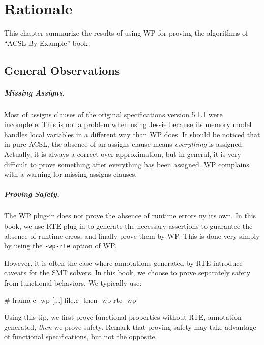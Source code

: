 \chapter{Rationale}

This chapter summurize the results of using \textsf{WP} for proving
the algorithms of ``ACSL By Example'' book.

\section{General Observations}

\paragraph{Missing Assigns.} 
Most of assigns clauses of the original specifications version 5.1.1
were incomplete. This is not a problem when using \textsf{Jessie}
because its memory model handles local variables in a different way
than \textsf{WP} does. It should be noticed that in pure
\textsf{ACSL}, the absence of an assigns clause means
\emph{everything} is assigned.  Actually, it is always a correct
over-approximation, but in general, it is very difficult to prove
something after everything has been assigned. \textsf{WP} complains
with a warning for missing assigns clauses.

\paragraph{Proving Safety.}
The \textsf{WP} plug-in does not prove the absence of runtime errors
ny its own. In this book, we use \textsf{RTE} plug-in to generate the
necessary assertions to guarantee the absence of runtime erros, and
finally prove them by \textsf{WP}. This is done very simply by using
the \texttt{-wp-rte} option of \textsf{WP}.

However, it is often the case where annotations generated by \textsf{RTE}
introduce caveats for the \textsf{SMT} solvers. In this book, we choose to
prove separately safety from functional behaviors. We typically use:

\begin{shell}
# frama-c -wp [...] file.c -then -wp-rte -wp
\end{shell}

Using this tip, we first prove functional properties without \textsf{RTE},
annotation generated, \emph{then} we prove safety. Remark that proving safety 
may take advantage of functional specifications, but not the opposite.

